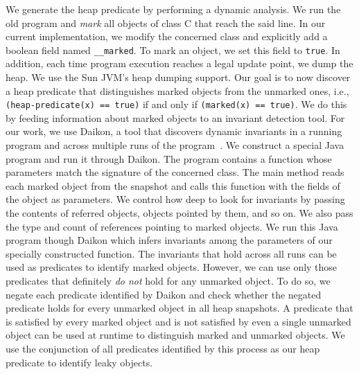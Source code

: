 We generate the heap predicate by performing a dynamic analysis. We run the
old program and \emph{mark} all objects of class C that reach the said
line. 
In our current implementation, we modify the concerned class and explicitly add a boolean field named {\tt \_\_marked}.
To mark an object, we set this field to {\tt true}.
In addition, each time program execution reaches a
legal update point, we dump the heap. We use the Sun JVM's heap dumping
support. Our goal is to now discover a heap predicate that distinguishes
marked objects from the unmarked ones, i.e., {\tt (heap-predicate(x) ==
true)} if
and only if {\tt (marked(x) == true)}. We do this by feeding information about
marked objects to an invariant detection tool. For our work, we use Daikon,
a tool that discovers dynamic invariants in a running program and across
multiple runs of the program~\cite{daikon}. We construct a special Java
program and run it through Daikon. The program contains a function whose
parameters match the signature of the concerned class. The main method
reads each marked object from the snapshot and calls this function with the
fields of the object as parameters. We control how deep to look for
invariants by passing the contents of referred objects, objects pointed by
them, and so on. We also pass the type and count of references pointing to
marked objects.
We run this Java program though Daikon which infers invariants among the
parameters of our specially constructed function. The invariants that hold
across all runs can be used as predicates to identify marked objects.
However, we can use only those predicates that definitely \emph{do not}
hold for any unmarked object. To do so, we negate each predicate identified
by Daikon and check whether the negated predicate holds for every unmarked
object in all heap snapshots. A predicate that is satisfied by every
marked object and is not satisfied by even a single unmarked object can be
used at runtime to distinguish marked and unmarked objects. We use the
conjunction of all predicates identified by this process as our heap
predicate to identify leaky objects.


